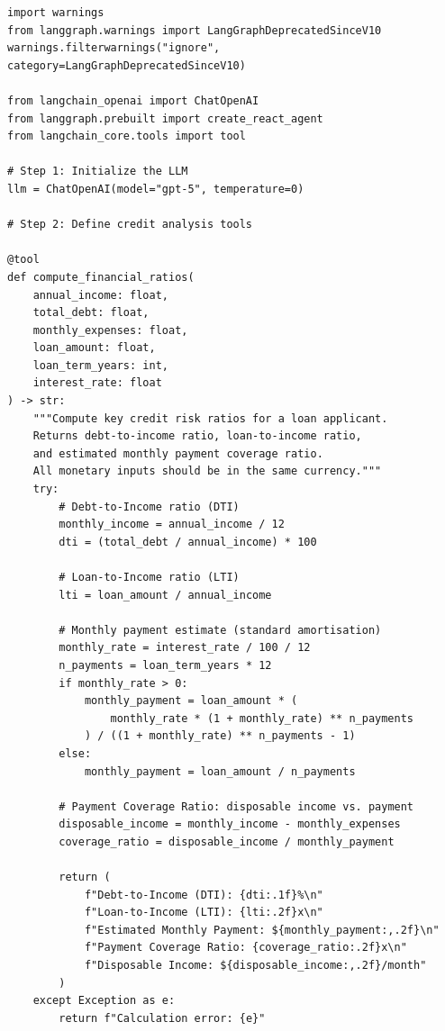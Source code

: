 \documentclass{article}
\begin{document}
\begin{verbatim}
import warnings
from langgraph.warnings import LangGraphDeprecatedSinceV10
warnings.filterwarnings("ignore", category=LangGraphDeprecatedSinceV10)

from langchain_openai import ChatOpenAI
from langgraph.prebuilt import create_react_agent
from langchain_core.tools import tool

# Step 1: Initialize the LLM
llm = ChatOpenAI(model="gpt-5", temperature=0)

# Step 2: Define credit analysis tools

@tool
def compute_financial_ratios(
    annual_income: float,
    total_debt: float,
    monthly_expenses: float,
    loan_amount: float,
    loan_term_years: int,
    interest_rate: float
) -> str:
    """Compute key credit risk ratios for a loan applicant.
    Returns debt-to-income ratio, loan-to-income ratio,
    and estimated monthly payment coverage ratio.
    All monetary inputs should be in the same currency."""
    try:
        # Debt-to-Income ratio (DTI)
        monthly_income = annual_income / 12
        dti = (total_debt / annual_income) * 100

        # Loan-to-Income ratio (LTI)
        lti = loan_amount / annual_income

        # Monthly payment estimate (standard amortisation)
        monthly_rate = interest_rate / 100 / 12
        n_payments = loan_term_years * 12
        if monthly_rate > 0:
            monthly_payment = loan_amount * (
                monthly_rate * (1 + monthly_rate) ** n_payments
            ) / ((1 + monthly_rate) ** n_payments - 1)
        else:
            monthly_payment = loan_amount / n_payments

        # Payment Coverage Ratio: disposable income vs. payment
        disposable_income = monthly_income - monthly_expenses
        coverage_ratio = disposable_income / monthly_payment

        return (
            f"Debt-to-Income (DTI): {dti:.1f}%\n"
            f"Loan-to-Income (LTI): {lti:.2f}x\n"
            f"Estimated Monthly Payment: ${monthly_payment:,.2f}\n"
            f"Payment Coverage Ratio: {coverage_ratio:.2f}x\n"
            f"Disposable Income: ${disposable_income:,.2f}/month"
        )
    except Exception as e:
        return f"Calculation error: {e}"



\end{verbatim}
\end{document}
